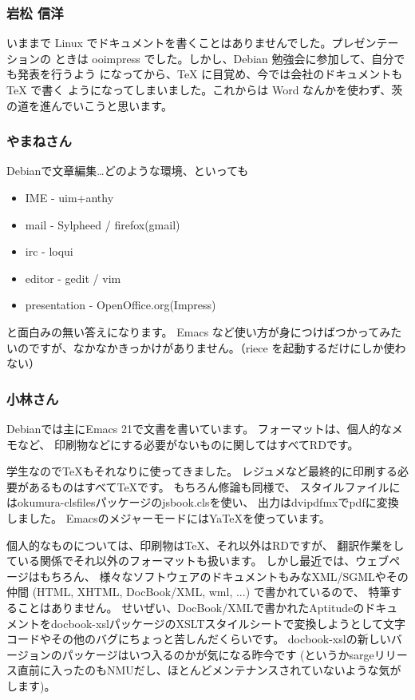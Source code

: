 \documentclass[mingoth,a4paper]{jsarticle}
\begin{document}
\subsubsection{岩松 信洋}
いままで Linux でドキュメントを書くことはありませんでした。プレゼンテーションの
ときは ooimpress でした。しかし、Debian 勉強会に参加して、自分でも発表を行うよう
になってから、\TeX{} に目覚め、今では会社のドキュメントも \TeX{} で書く
ようになってしまいました。これからは Word なんかを使わず、茨の道を進んでいこうと思います。

\subsubsection{やまねさん}
Debianで文章編集…どのような環境、といっても

\begin{itemize}
 \item IME        - uim+anthy
 \item mail        - Sylpheed / firefox(gmail)
 \item irc        - loqui
 \item editor     - gedit / vim
 \item presentation    - OpenOffice.org(Impress)
\end{itemize}

と面白みの無い答えになります。
Emacs など使い方が身につけばつかってみたいのですが、なかなかきっかけがありません。（riece を起動するだけにしか使わない）

\subsubsection{小林さん}

Debianでは主にEmacs 21で文書を書いています。
フォーマットは、個人的なメモなど、
印刷物などにする必要がないものに関してはすべてRDです。

学生なので\TeX{}もそれなりに使ってきました。
レジュメなど最終的に印刷する必要があるものはすべて\TeX{}です。
もちろん修論も同様で、
スタイルファイルにはokumura-clsfilesパッケージのjsbook.clsを使い、
出力はdvipdfmxでpdfに変換しました。
EmacsのメジャーモードにはYa\TeX{}を使っています。

個人的なものについては、印刷物は\TeX{}、それ以外はRDですが、
翻訳作業をしている関係でそれ以外のフォーマットも扱います。
しかし最近では、ウェブページはもちろん、
様々なソフトウェアのドキュメントもみなXML/SGMLやその仲間 (HTML, XHTML, DocBook/XML, wml, ...) で書かれているので、
特筆することはありません。
せいぜい、DocBook/XMLで書かれたAptitudeのドキュメントをdocbook-xslパッケージのXSLTスタイルシートで変換しようとして文字コードやその他のバグにちょっと苦しんだくらいです。
docbook-xslの新しいバージョンのパッケージはいつ入るのかが気になる昨今です (というかsargeリリース直前に入ったのもNMUだし、ほとんどメンテナンスされていないような気がします)。
\end{document}
